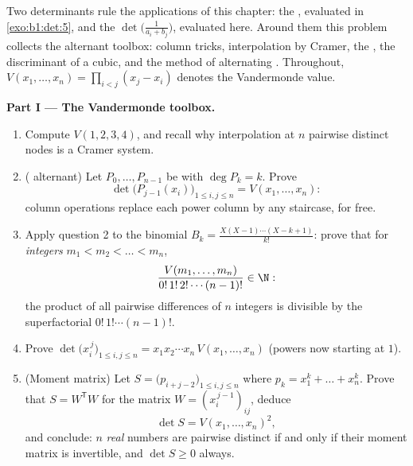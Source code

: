 \begin{problem}\label{pb:b1:det:1}
Two determinants rule the applications of this chapter: the
, evaluated in \cref{exo:b1:det:5}, and
the \emph{} $\det\bigl(\frac{1}{a_i +
b_j}\bigr)$, evaluated here. Around them this problem collects
the alternant toolbox:  column tricks, interpolation
by Cramer, the , the discriminant of a cubic, and
the method of alternating . Throughout, $V(x_1,
\dots, x_n) = \prod_{i < j}(x_j - x_i)$ denotes the Vandermonde
value.

\medskip
\noindent\textbf{Part I --- The Vandermonde toolbox.}
\begin{enumerate}
  \item Compute $V(1, 2, 3, 4)$, and recall why interpolation at
        $n$ pairwise distinct nodes is a Cramer system.
  \item ( alternant) Let $P_0, \dots, P_{n-1}$ be
        \emph{} with $\deg P_k = k$. Prove
        \[
        \det\bigl(P_{j-1}(x_i)\bigr)_{1 \leq i, j \leq n}
        = V(x_1, \dots, x_n) :
        \]
        column operations replace each power column by any 
        staircase, for free.
  \item Apply question 2 to the binomial  $B_k =
        \frac{X(X-1)\cdots(X-k+1)}{k!}$: prove that for
        \emph{integers} $m_1 < m_2 < \dots < m_n$,
        \[
        \frac{V(m_1, \dots, m_n)}{0!\,1!\,2!\cdots(n-1)!}
        \in \N :
        \]
        the product of all pairwise differences of $n$ integers
        is divisible by the superfactorial $0!\,1!\cdots(n-1)!$.
  \item Prove $\det\bigl(x_i^{\,j}\bigr)_{1 \leq i, j \leq n} =
        x_1 x_2 \cdots x_n\, V(x_1, \dots, x_n)$ (powers now
        starting at $1$).
  \item (Moment matrix) Let $S = \bigl(p_{i+j-2}\bigr)_{1 \leq
        i, j \leq n}$ where $p_k = x_1^k + \dots + x_n^k$. Prove
        that $S = W^{\mathsf T} W$ for the matrix $W =
        (x_i^{\,j-1})_{ij}$, deduce
        \[
        \det S = V(x_1, \dots, x_n)^2 ,
        \]
        and conclude: $n$ \emph{real} numbers are pairwise
        distinct if and only if their moment matrix is
        invertible, and $\det S \geq 0$ always.
\end{enumerate}


\end{problem}
